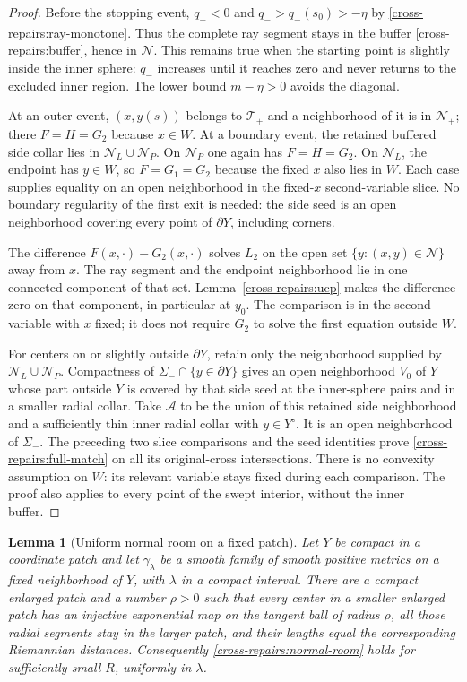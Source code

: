 \documentclass[11pt]{article}
\newtheorem{lemma}[theorem]{Lemma}
\theoremstyle{definition}
\theoremstyle{remark}
\numberwithin{equation}{section}
\begin{document}
\begin{proof}
Before the stopping event, $q_+<0$ and
$q_->q_-(s_0)>-\eta$ by \eqref{cross-repairs:ray-monotone}.
Thus the complete ray segment stays in the buffer
\eqref{cross-repairs:buffer}, hence in $\mathcal N$.
This remains true when the starting point is slightly inside the inner
sphere: $q_-$ increases until it reaches zero and never returns to the
excluded inner region. The lower bound $m-\eta>0$ avoids the diagonal.

At an outer event, $(x,y(s))$ belongs to $\mathcal T_+$ and a neighborhood
of it is in $\mathcal N_+$; there $F=H=G_2$ because $x\in W$.
At a boundary event, the retained buffered side collar lies in
$\mathcal N_L\cup\mathcal N_P$. On $\mathcal N_P$ one again has
$F=H=G_2$. On $\mathcal N_L$, the endpoint has $y\in W$, so
$F=G_1=G_2$ because the fixed $x$ also lies in $W$.
Each case supplies equality on an open neighborhood in the fixed-$x$
second-variable slice. No boundary regularity of the first exit is
needed: the side seed is an open neighborhood covering every point
of $\partial Y$, including corners.

The difference $F(x,\cdot)-G_2(x,\cdot)$ solves $L_2$ on the open set
$\{y:(x,y)\in\mathcal N\}$ away from $x$.
The ray segment and the endpoint neighborhood lie in one connected
component of that set. Lemma~\ref{cross-repairs:ucp} makes the difference
zero on that component, in particular at $y_0$.
The comparison is in the second variable with $x$ fixed; it does not
require $G_2$ to solve the first equation outside $W$.

For centers on or slightly outside $\partial Y$, retain only the
neighborhood supplied by $\mathcal N_L\cup\mathcal N_P$.
Compactness of $\Sigma_-\cap\{y\in\partial Y\}$ gives an open
neighborhood $V_0$ of $Y$ whose part outside $Y$ is covered by that side
seed at the inner-sphere pairs and in a smaller radial collar.
Take $\mathcal A$ to be the union of this retained side neighborhood
and a sufficiently thin inner radial collar with $y\in Y^\circ$.
It is an open neighborhood of $\Sigma_-$.
The preceding two slice comparisons and the seed identities prove
\eqref{cross-repairs:full-match} on all its original-cross intersections.
There is no convexity assumption on $W$: its relevant variable stays
fixed during each comparison. The proof also applies to every point of
the swept interior, without the inner buffer.
\end{proof}

\begin{lemma}[Uniform normal room on a fixed patch]
\label{cross-repairs:uniform-normal}
Let $Y$ be compact in a coordinate patch and let $\gamma_\lambda$ be a
smooth family of smooth positive metrics on a fixed neighborhood of
$Y$, with $\lambda$ in a compact interval. There are a compact enlarged
patch and a number $\rho>0$ such that every center in a smaller enlarged
patch has an injective exponential map on the tangent ball of radius
$\rho$, all those radial segments stay in the larger patch, and their
lengths equal the corresponding Riemannian distances. Consequently
\eqref{cross-repairs:normal-room} holds for sufficiently small $R$,
uniformly in $\lambda$.
\end{lemma}
\end{document}
